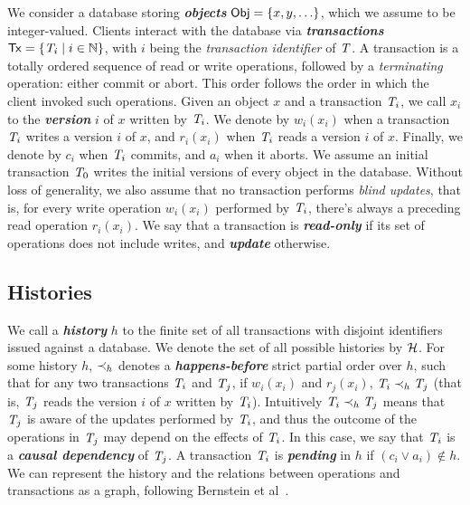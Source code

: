 We consider a database storing \textbf{\em objects} ${\sf Obj} = \{x, y, \ldots\}$, which we assume to be integer-valued. Clients interact with the database via \textbf{\em transactions} ${\sf Tx} = \{\mathit{T}_i \mid i \in \mathbb{N}\}$, with $i$ being the \emph{transaction identifier} of $\mathit{T}$. A transaction is a totally ordered sequence of read or write operations, followed by a \emph{terminating} operation: either commit or abort. This order follows the order in which the client invoked such operations. Given an object $x$ and a transaction $\mathit{T}_i$, we call $x_i$ to the \textbf{\em version} $i$ of $x$ written by $\mathit{T}_i$. We denote by $w_i(x_i)$ when a transaction $\mathit{T}_i$ writes a version $i$ of $x$, and $r_i(x_i)$ when $\mathit{T}_i$ reads a version $i$ of $x$. Finally, we denote by $c_i$ when $\mathit{T}_i$ commits, and $a_i$ when it aborts. We assume an initial transaction $\mathit{T}_0$ writes the initial versions of every object in the database. Without loss of generality, we also assume that no transaction performs \emph{blind updates}, that is, for every write operation $w_i(x_i)$ performed by $\mathit{T}_i$, there's always a preceding read operation $r_i(x_i)$. We say that a transaction is \textbf{\em read-only} if its set of operations does not include writes, and \textbf{\em update} otherwise.

\subsection{Histories}

We call a \textbf{\em history} $h$ to the finite set of all transactions with disjoint identifiers issued against a database. We denote the set of all possible histories by $\mathcal{H}$. For some history $h$, $\prec_h$ denotes a \textbf{\em happens-before} strict partial order over $h$, such that for any two transactions $\mathit{T}_i$ and $\mathit{T}_j$, if $w_i(x_i)$ and $r_j(x_i)$, $\mathit{T}_i \prec_h \mathit{T}_j$ (that is, $\mathit{T}_j$ reads the version $i$ of $x$ written by $\mathit{T}_i$). Intuitively $\mathit{T}_i \prec_h \mathit{T}_j$ means that $\mathit{T}_j$ is aware of the updates performed by $\mathit{T}_i$, and thus the outcome of the operations in $\mathit{T}_j$ may depend on the effects of $\mathit{T}_i$. In this case, we say that $\mathit{T}_i$ is a \textbf{\em causal dependency} of $\mathit{T}_j$. A transaction $\mathit{T}_i$ is \textbf{\em pending} in $h$ if $(c_i \vee a_i) \notin h$. We can represent the history and the relations between operations and transactions as a graph, following Bernstein et al~\citep{bernstein_concurrency}.

